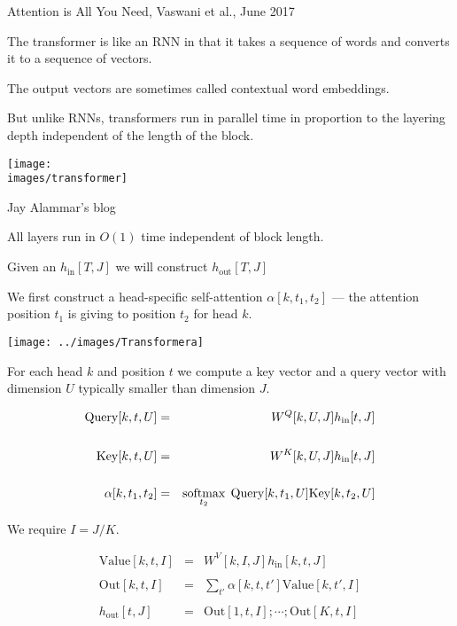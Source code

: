 {

Attention is All You Need, Vaswani et al., June 2017

\vfill
The transformer is like an RNN in that it takes a sequence of words and converts it to a sequence of vectors.

\vfill
The output vectors are sometimes called contextual word embeddings.

\vfill
But unlike RNNs, transformers run in parallel time in proportion to the layering depth
independent of the length of the block.


\centerline{\texttt{[image: \\images/transformer]}}

{\huge
\centerline{Jay Alammar's blog}
}

All layers run in $O(1)$ time independent of block length.


Given an $h_\mathrm{in}[T,J]$ we will construct $h_\mathrm{out}[T,J]$
\vfill

We first construct a head-specific self-attention $\alpha[k,t_1,t_2]$ --- the attention position
$t_1$ is giving to position $t_2$ for head $k$.

\vfill
\centerline{\texttt{[image: ../images/Transformera]}}


For each head $k$ and position $t$ we compute a key vector and a query vector with dimension $U$ typically smaller than dimension $J$.
      
\begin{eqnarray*}
\mathrm{Query}[k,t,U] & = & W^Q[k,U,J]h_\mathrm{in}[t,J] \\
\\
\mathrm{Key}[k,t,U] & = &  W^K[k,U,J]h_\mathrm{in}[t,J] \\
\\
\alpha[k,t_1,t_2] & = & \operatorname*{softmax}_{t_2}\; \mathrm{Query}[k,t_1,U]\mathrm{Key}[k,t_2,U]
\end{eqnarray*}


We require $I = J/K$.
      
\begin{eqnarray*}
\mathrm{Value}[k,t,I] & = & W^V[k,I,J]h_\mathrm{in}[k,t,J] \\
\\
\mathrm{Out}[k,t,I] & = & \sum_{t'}\alpha[k,t,t']\mathrm{Value}[k,t',I] \\
\\
h_\mathrm{out}[t,J] & = & \mathrm{Out}[1,t,I];\cdots;\mathrm{Out}[K,t,I]
\end{eqnarray*}

}
